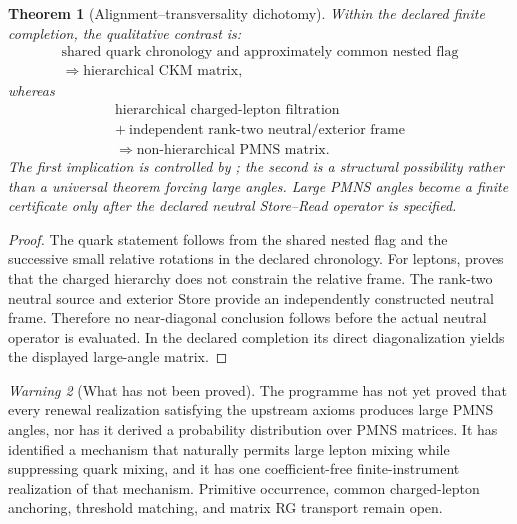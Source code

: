 \documentclass[11pt,oneside,openany]{book}
\numberwithin{equation}{chapter}
\newtheorem{theorem}{Theorem}[chapter]
\theoremstyle{definition}
\theoremstyle{remark}
\newtheorem{warning}[theorem]{Warning}
\begin{document}
\begin{theorem}[Alignment--transversality dichotomy]
\label{thm:alignment-transversality}
Within the declared finite completion, the qualitative contrast is:
\[
 \boxed{
 \begin{array}{c}
 \text{shared quark chronology and approximately common nested flag}\\
 \Longrightarrow\text{hierarchical CKM matrix},
 \end{array}}
\]
whereas
\[
 \boxed{
 \begin{array}{c}
 \text{hierarchical charged-lepton filtration}\\
 +\ \text{independent rank-two neutral/exterior frame}\\
 \Longrightarrow\text{non-hierarchical PMNS matrix}.
 \end{array}}
\]
The first implication is controlled by
; the second is a structural possibility rather
than a universal theorem forcing large angles.  Large PMNS angles become a
finite certificate only after the declared neutral Store--Read operator is
specified.
\end{theorem}

\begin{proof}
The quark statement follows from the shared nested flag and the successive
small relative rotations in the declared chronology.  For leptons,
 proves that the charged hierarchy does
not constrain the relative frame.  The rank-two neutral source and exterior
Store provide an independently constructed neutral frame.  Therefore no
near-diagonal conclusion follows before the actual neutral operator is
evaluated.  In the declared completion its direct diagonalization yields the
displayed large-angle matrix.
\end{proof}

\begin{warning}[What has not been proved]
The programme has not yet proved that every renewal realization satisfying
the upstream axioms produces large PMNS angles, nor has it derived a
probability distribution over PMNS matrices.  It has identified a mechanism
that naturally permits large lepton mixing while suppressing quark mixing,
and it has one coefficient-free finite-instrument realization of that
mechanism.  Primitive occurrence, common charged-lepton anchoring,
threshold matching, and matrix RG transport remain open.
\end{warning}
\end{document}
